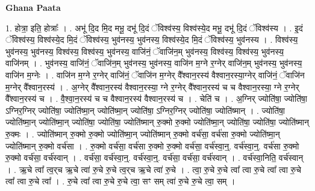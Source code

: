 \documentclass[17pt]{extarticle}
\begin{document}
\textbf{Ghana Paata } \newline

1. होत्रा॒ इति॒ होत्राः᳚ । . अभू॑ दि॒द मि॒द मभू॒ दभू॑ दि॒दं ॅविश्व॑स्य॒ विश्व॑स्ये॒द मभू॒ दभू॑ दि॒दं ॅविश्व॑स्य । . इ॒दं ॅविश्व॑स्य॒ विश्व॑स्ये॒द मि॒दं ॅविश्व॑स्य॒ भुव॑नस्य॒ भुव॑नस्य॒ विश्व॑स्ये॒द मि॒दं ॅविश्व॑स्य॒ भुव॑नस्य । . विश्व॑स्य॒ भुव॑नस्य॒ भुव॑नस्य॒ विश्व॑स्य॒ विश्व॑स्य॒ भुव॑नस्य॒ वाजि॑नं॒ ॅवाजि॑न॒म् भुव॑नस्य॒ विश्व॑स्य॒ विश्व॑स्य॒ भुव॑नस्य॒ वाजि॑नम् । . भुव॑नस्य॒ वाजि॑नं॒ ॅवाजि॑न॒म् भुव॑नस्य॒ भुव॑नस्य॒ वाजि॑न म॒ग्ने र॒ग्नेर् वाजि॑न॒म् भुव॑नस्य॒ भुव॑नस्य॒ वाजि॑न म॒ग्नेः । . वाजि॑न म॒ग्ने र॒ग्नेर् वाजि॑नं॒ ॅवाजि॑न म॒ग्नेर् वै᳚श्वान॒रस्य॑ वैश्वान॒रस्या॒ग्नेर् वाजि॑नं॒ ॅवाजि॑न म॒ग्नेर् वै᳚श्वान॒रस्य॑ । . अ॒ग्नेर् वै᳚श्वान॒रस्य॑ वैश्वान॒रस्या॒ ग्ने र॒ग्नेर् वै᳚श्वान॒रस्य॑ च च वैश्वान॒रस्या॒ ग्ने र॒ग्नेर् वै᳚श्वान॒रस्य॑ च । . वै॒श्वा॒न॒रस्य॑ च च वैश्वान॒रस्य॑ वैश्वान॒रस्य॑ च । . चेति॑ च । . अ॒ग्निर् ज्योति॑षा॒ ज्योति॑षा॒ ऽग्निर॒ग्निर् ज्योति॑षा॒ ज्योति॑ष्मा॒न् ज्योति॑ष्मा॒न् ज्योति॑षा॒ ऽग्निर॒ग्निर् ज्योति॑षा॒ ज्योति॑ष्मान् । . ज्योति॑षा॒ ज्योति॑ष्मा॒न् ज्योति॑ष्मा॒न् ज्योति॑षा॒ ज्योति॑षा॒ ज्योति॑ष्मान् रु॒क्मो रु॒क्मो ज्योति॑ष्मा॒न् ज्योति॑षा॒ ज्योति॑षा॒ ज्योति॑ष्मान् रु॒क्मः । . ज्योति॑ष्मान् रु॒क्मो रु॒क्मो ज्योति॑ष्मा॒न् ज्योति॑ष्मान् रु॒क्मो वर्च॑सा॒ वर्च॑सा रु॒क्मो ज्योति॑ष्मा॒न् ज्योति॑ष्मान् रु॒क्मो वर्च॑सा । . रु॒क्मो वर्च॑सा॒ वर्च॑सा रु॒क्मो रु॒क्मो वर्च॑सा॒ वर्च॑स्वा॒न्॒. वर्च॑स्वा॒न्॒. वर्च॑सा रु॒क्मो रु॒क्मो वर्च॑सा॒ वर्च॑स्वान् । . वर्च॑सा॒ वर्च॑स्वा॒न्॒. वर्च॑स्वा॒न्॒. वर्च॑सा॒ वर्च॑सा॒ वर्च॑स्वान् । . वर्च॑स्वा॒निति॒ वर्च॑स्वान् । . ऋ॒चे त्वा᳚ त्व॒र्‌च ऋ॒चे त्वा॑ रु॒चे रु॒चे त्व॒र्‌च ऋ॒चे त्वा॑ रु॒चे । . त्वा॒ रु॒चे रु॒चे त्वा᳚ त्वा रु॒चे त्वा᳚ त्वा रु॒चे त्वा᳚ त्वा रु॒चे त्वा᳚ । . रु॒चे त्वा᳚ त्वा रु॒चे रु॒चे त्वा॒ सꣳ सम् त्वा॑ रु॒चे रु॒चे त्वा॒ सम् । \newline
\end{document}
